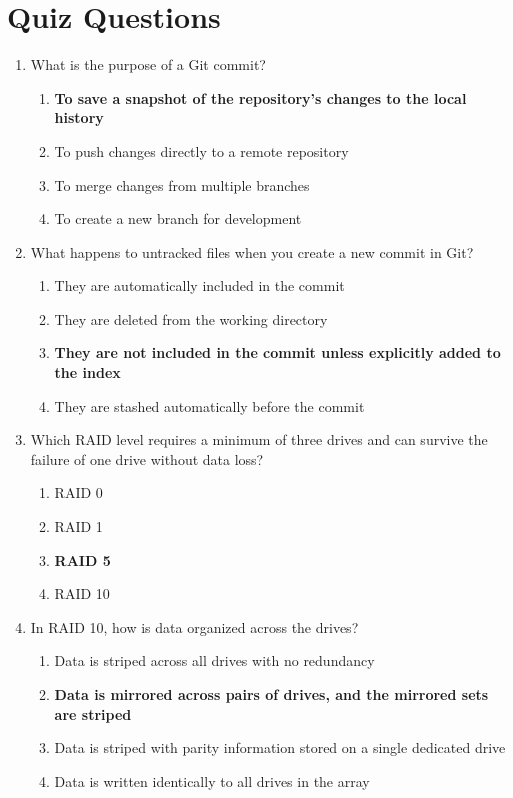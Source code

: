 \newpage

\section{Quiz Questions}

\begin{enumerate}
    \item What is the purpose of a Git commit?
    \begin{enumerate}
        \item \textbf{To save a snapshot of the repository’s changes to the
              local history}
        \item To push changes directly to a remote repository
        \item To merge changes from multiple branches
        \item To create a new branch for development
    \end{enumerate}

    \item What happens to untracked files when you create a new commit in Git?
    \begin{enumerate}
        \item They are automatically included in the commit
        \item They are deleted from the working directory
        \item \textbf{They are not included in the commit unless explicitly
              added to the index}
        \item They are stashed automatically before the commit
    \end{enumerate}

    \item Which RAID level requires a minimum of three drives and can survive
          the failure of one drive without data loss?
    \begin{enumerate}
        \item RAID 0
        \item RAID 1
        \item \textbf{RAID 5}
        \item RAID 10
    \end{enumerate}

    \item In RAID 10, how is data organized across the drives?
    \begin{enumerate}
        \item Data is striped across all drives with no redundancy
        \item \textbf{Data is mirrored across pairs of drives, and the mirrored
                      sets are striped}
        \item Data is striped with parity information stored on a single
              dedicated drive
        \item Data is written identically to all drives in the array
    \end{enumerate}


\end{enumerate}
